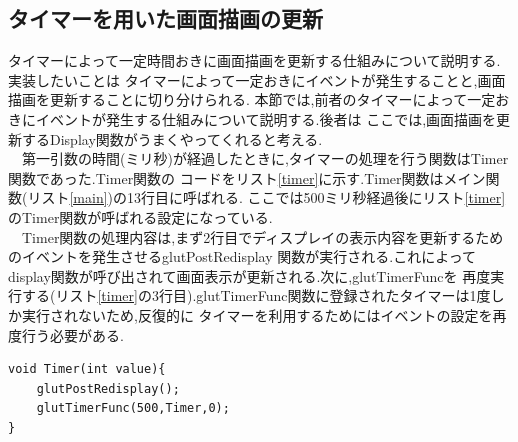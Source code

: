 \documentclass[a4j]{jarticle}
\begin{document}
    \subsection{タイマーを用いた画面描画の更新}
    タイマーによって一定時間おきに画面描画を更新する仕組みについて説明する.実装したいことは
    タイマーによって一定おきにイベントが発生することと,画面描画を更新することに切り分けられる.
    本節では,前者のタイマーによって一定おきにイベントが発生する仕組みについて説明する.後者は
    ここでは,画面描画を更新するDisplay関数がうまくやってくれると考える.\\
    　第一引数の時間(ミリ秒)が経過したときに,タイマーの処理を行う関数はTimer関数であった.Timer関数の
    コードをリスト\ref{timer}に示す.Timer関数はメイン関数(リスト\ref{main})の13行目に呼ばれる.
    ここでは500ミリ秒経過後にリスト\ref{timer}のTimer関数が呼ばれる設定になっている.\\
    　Timer関数の処理内容は,まず2行目でディスプレイの表示内容を更新するためのイベントを発生させるglutPostRedisplay
    関数が実行される.これによってdisplay関数が呼び出されて画面表示が更新される.次に,glutTimerFuncを
    再度実行する(リスト\ref{timer}の3行目).glutTimerFunc関数に登録されたタイマーは1度しか実行されないため,反復的に
    タイマーを利用するためにはイベントの設定を再度行う必要がある.
    
    \begin{lstlisting}[basicstyle=\ttfamily\footnotesize, frame=single,label=timer,caption=Timer関数]
void Timer(int value){
    glutPostRedisplay();
    glutTimerFunc(500,Timer,0);
}
            \end{lstlisting} 
\end{document}
